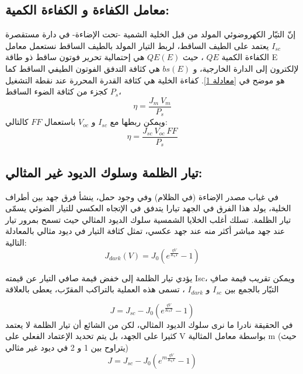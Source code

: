 \subsection{معامل الكفاءة و الكفاءة الكمية:}
إنّ التيّار الكهروضوئي المولد من قبل الخلية الشمية -تحت الإضاءة- في دارة مستقصرة $ I_{sc} $ يعتمد على الطيف الساقط، لربط التيار المولد بالطيف الساقط نستعمل معامل الكفاءة الكمية $ QE $ ، حيث $ QE(E) $ هي إحتمالية تحرير فوتون ساقط ذو طاقة E لإلكترون إلى الدارة الخارجية، و $ bs(E)  $ هي كثافة التدفق الفوتون الطيفي الساقط كما هو موضح في 
\ref{معادلة 1}.
كفاءة الخلية هي كثافة القدرة المحررة عند نقطة التشغيل كجزء من كثافة الضوء الساقط $ P_s $،
\begin{equation}
	\eta=\frac{J_m\ V_m}{P_s}
\end{equation}
ويمكن ربطها مع $ I_{sc} $ و $ V_{oc} $ باستعمال $ FF $ كالتالي:
\begin{equation}
	\eta=\frac{J_{sc}\ V_{oc}\ FF}{P_s}
\end{equation}
\subsection{تيار الظلمة وسلوك الديود غير المثالي:}
في غياب مصدر الإضاءة (في الظلام) وفي وجود حمل، ينشأ فرق جهد بين أطراف الخلية، يولد هذا الفرق في الجهد تيارا يتدفق في الإتجاه العكسي للتيار الضوئي يسمّى تيار الظلمة. تسلك أغلب الخلايا الشمسية سلوك الديود المثالي حيث تسمح بمرور تيار عند جهد مباشر أكثر منه عند جهد عكسي، تمثل كثافة التيار في ديود مثالي بالمعادلة التالية:
\begin{equation}
	J_{dark}\left( V\right) = J_0\left( e^{\frac{qV}{K_bT}}-1\right) 
\end{equation}

يؤدي تيار الظلمة إلى خفض قيمة صافي التيار عن قيمته Isc، ويمكن تقريب قيمة صافِ التيّار بالجمع بين $ I_{sc} $ و $ I_{dark} $ ، تسمى هذه العملية بالتراكب المقرّب، يعطى بالعلاقة

\begin{equation}
	J= J_{sc} - J_0\left( e^{\frac{qV}{K_bT}}-1\right) 
\end{equation}
في الحقيقة نادرا ما نرى سلوك الديود المثالي، لكن من الشائع أن تيار الظلمة لا يعتمد كثيرا على الجهد، بل يتم تحديد الإعتماد الفعلي على V بواسطة معامل المثالية m (حيث يتراوح بين 1 و 2 في ديود غير  مثالي) 
\begin{equation}
	J= J_{sc} - J_0\left( e^{m \frac{qV}{K_bT}}-1\right) 
\end{equation}
